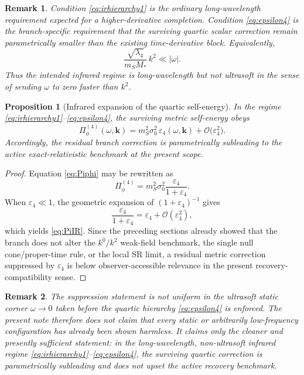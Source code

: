 \documentclass[11pt]{article}
\newtheorem{proposition}{Proposition}
\newtheorem{remark}{Remark}
\begin{document}
\begin{remark}
Condition \eqref{eq:irhierarchy1} is the ordinary long-wavelength requirement expected for a higher-derivative completion. Condition \eqref{eq:epsilon4} is the branch-specific requirement that the surviving quartic scalar correction remain parametrically smaller than the existing time-derivative block. Equivalently,
\begin{equation}
\frac{\sqrt{\lambda_4}}{m_SM_*}\,k^2\ll |\omega|.
\label{eq:nonultrasoft}
\end{equation}
Thus the intended infrared regime is long-wavelength but not ultrasoft in the sense of sending \(\omega\) to zero faster than \(k^2\).
\end{remark}

\begin{proposition}[Infrared expansion of the quartic self-energy]
In the regime \eqref{eq:irhierarchy1}--\eqref{eq:epsilon4}, the surviving metric self-energy obeys
\begin{equation}
\Pi_\phi^{(4)}(\omega,\mathbf{k})
=
m_S^2\sigma_0^2\,\varepsilon_4(\omega,\mathbf{k})
+ \mathcal O\!\bigl(\varepsilon_4^2\bigr).
\label{eq:PiIR}
\end{equation}
Accordingly, the residual branch correction is parametrically subleading to the active exact-relativistic benchmark at the present scope.
\end{proposition}

\begin{proof}
Equation \eqref{eq:Piphi} may be rewritten as
\begin{equation}
\Pi_\phi^{(4)}
=
m_S^2\sigma_0^2
\frac{\varepsilon_4}{1+\varepsilon_4}.
\label{eq:PiEps}
\end{equation}
When \(\varepsilon_4\ll 1\), the geometric expansion of \((1+\varepsilon_4)^{-1}\) gives
\begin{equation}
\frac{\varepsilon_4}{1+\varepsilon_4}
=
\varepsilon_4+\mathcal O(\varepsilon_4^2),
\end{equation}
which yields \eqref{eq:PiIR}. Since the preceding sections already showed that the branch does not alter the \(k^0/k^2\) weak-field benchmark, the single null cone/proper-time rule, or the local SR limit, a residual metric correction suppressed by \(\varepsilon_4\) is below observer-accessible relevance in the present recovery-compatibility sense.
\end{proof}

\begin{remark}
The suppression statement is not uniform in the ultrasoft static corner \(\omega\to 0\) taken before the quartic hierarchy \eqref{eq:epsilon4} is enforced. The present note therefore does not claim that every static or arbitrarily low-frequency configuration has already been shown harmless. It claims only the cleaner and presently sufficient statement: in the long-wavelength, non-ultrasoft infrared regime \eqref{eq:irhierarchy1}--\eqref{eq:epsilon4}, the surviving quartic correction is parametrically subleading and does not upset the active recovery benchmark.
\end{remark}
\end{document}
